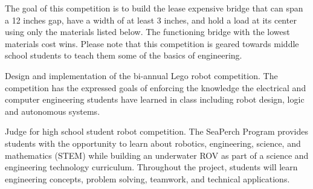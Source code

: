 \begin{resume}
\begin{position}
The goal of this competition is to build the lease expensive bridge that can span a 12 inches gap, have a width of at least 3 inches, and hold a load at its center using only the materials listed below. The functioning bridge with the lowest materials cost wins. Please note that this competition is geared towards middle school students to teach them some of the basics of engineering.
\end{position}

\begin{position}
Design and implementation of the bi-annual Lego robot competition.  The competition has the expressed goals of enforcing the knowledge the electrical and computer engineering students have learned in class including robot design, logic and autonomous systems.
\end{position}

\begin{position}
Judge for high school student robot competition.  The SeaPerch Program provides students with the opportunity to learn about robotics, engineering, science, and mathematics (STEM) while building an underwater ROV as part of a science and engineering technology curriculum. Throughout the project, students will learn engineering concepts, problem solving, teamwork, and technical applications.
\end{position}









\end{resume}

